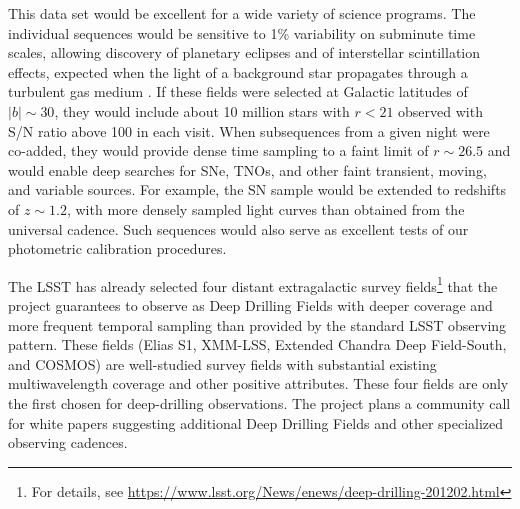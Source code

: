 This data set would be excellent for a wide variety of science programs. The
individual sequences would be sensitive to 1\% variability on subminute time
scales, allowing discovery of planetary eclipses and of interstellar scintillation
effects, expected when the light of a background star propagates through a
turbulent gas medium \citep{2003A&A...412..105M, 2011A&A...525A.108H}.
If these fields were selected
at Galactic latitudes of $|b|\sim30$\arcdeg, they would include about 10 million
stars with $r<21$ observed with S/N ratio above 100 in each visit.
When subsequences from a given night were co-added, they would
provide dense time sampling to a faint limit of $r\sim26.5$
and would enable deep searches
for SNe, TNOs, and other faint transient, moving, and
variable sources.  For example, the SN sample
would be extended to redshifts of $z\sim1.2$, with more densely sampled light
curves than obtained from the universal cadence. Such sequences would also
serve as excellent tests of our photometric calibration procedures.

The LSST has already selected four distant extragalactic survey fields\footnote{For
details, see \url{https://www.lsst.org/News/enews/deep-drilling-201202.html}}
that the project guarantees to observe as Deep Drilling Fields with deeper coverage
and more frequent temporal sampling than provided by the standard LSST observing
pattern. These fields (Elias S1, XMM-LSS, Extended Chandra Deep Field-South, and
COSMOS) are  well-studied survey fields with substantial existing multiwavelength
coverage and other positive attributes. These four fields are only the first chosen
for deep-drilling observations.  The project plans a community call
for white papers suggesting additional Deep Drilling Fields and other
specialized observing cadences.


